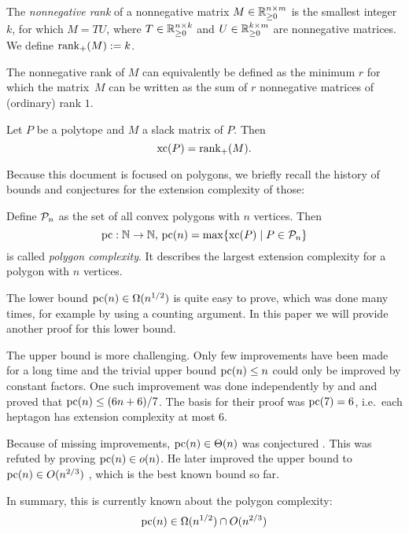 \begin{definition}
  The \emph{nonnegative rank} of a nonnegative matrix $M \in \R_{\geq 0}^{n \times m}$ is the smallest integer $k$, for which $M = TU$, where $T \in \R_{\geq 0}^{n \times k}$ and $U \in \R_{\geq 0}^{k \times m}$ are nonnegative matrices.
  We define $\rank_+(M) := k$.
\end{definition}

The nonnegative rank of $M$ can equivalently be defined as the minimum $r$ for which the matrix~$M$ can be written as the sum of $r$ nonnegative matrices of (ordinary) rank $1$.

\begin{theorem}
  Let $P$ be a polytope and $M$ a slack matrix of $P$. Then $$\xc(P) = \rank_+(M) .$$
\end{theorem}

Because this document is focused on polygons, we briefly recall the history of bounds and conjectures for the extension complexity of those:

Define $\P_n$ as the set of all convex polygons with $n$ vertices. Then $$\pc:\N \to \N,\,\pc(n) = \max \{\xc(P) \mid P \in \P_n\}$$ is called \emph{polygon complexity}. It describes the largest extension complexity for a polygon with $n$ vertices.

The lower bound $\pc(n) \in \Omega(n^{1/2})$ is quite easy to prove, which was done many times, for example by \textcite{fiorini2012extended} using a counting argument. In this paper we will provide another proof for this lower bound.

The upper bound is more challenging. Only few improvements have been made for a long time and the trivial upper bound $\pc(n) \leq n$ could only be improved by constant factors. One such improvement was done independently by \textcite{shitov2014upper} and \textcite{padrol2014polygons} and proved that $\pc(n) \leq (6n+6)/7$. The basis for their proof was $\pc(7)=6$, i.e.\ each heptagon has extension complexity at most 6.

Because of missing improvements, $\pc(n) \in \Theta(n)$ was conjectured \cite{fiorini2012extended}. This was refuted by \textcite{shitov2014sublinear} proving $\pc(n) \in o(n)$. He later improved the upper bound to $\pc(n) \in O(n^{2/3})$ \cite{shitov2020sublinear}, which is the best known bound so far.

In summary, this is currently known about the polygon complexity:
$$\pc(n) \in \Omega(n^{1/2}) \cap O(n^{2/3})$$

